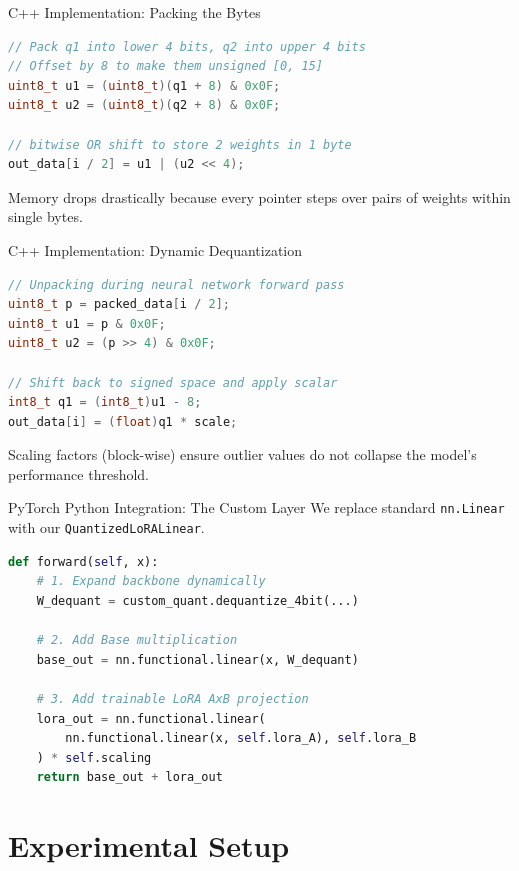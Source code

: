 \documentclass[aspectratio=169]{beamer}
\begin{document}
\begin{frame}[fragile]{C++ Implementation: Packing the Bytes}
    \begin{lstlisting}[language=C++]
// Pack q1 into lower 4 bits, q2 into upper 4 bits
// Offset by 8 to make them unsigned [0, 15]
uint8_t u1 = (uint8_t)(q1 + 8) & 0x0F;
uint8_t u2 = (uint8_t)(q2 + 8) & 0x0F;

// bitwise OR shift to store 2 weights in 1 byte
out_data[i / 2] = u1 | (u2 << 4);
    \end{lstlisting}
    \vspace{0.5cm}
    Memory drops drastically because every pointer steps over pairs of weights within single bytes.
\end{frame}

\begin{frame}[fragile]{C++ Implementation: Dynamic Dequantization}
    \begin{lstlisting}[language=C++]
// Unpacking during neural network forward pass
uint8_t p = packed_data[i / 2];
uint8_t u1 = p & 0x0F;
uint8_t u2 = (p >> 4) & 0x0F;

// Shift back to signed space and apply scalar
int8_t q1 = (int8_t)u1 - 8;
out_data[i] = (float)q1 * scale;
    \end{lstlisting}
    \vspace{0.5cm}
    Scaling factors (block-wise) ensure outlier values do not collapse the model's performance threshold.
\end{frame}

\begin{frame}[fragile]{PyTorch Python Integration: The Custom Layer}
     We replace standard \texttt{nn.Linear} with our \texttt{QuantizedLoRALinear}.
     \begin{lstlisting}[language=Python]
def forward(self, x):
    # 1. Expand backbone dynamically
    W_dequant = custom_quant.dequantize_4bit(...)
    
    # 2. Add Base multiplication
    base_out = nn.functional.linear(x, W_dequant)
    
    # 3. Add trainable LoRA AxB projection
    lora_out = nn.functional.linear(
        nn.functional.linear(x, self.lora_A), self.lora_B
    ) * self.scaling
    return base_out + lora_out
    \end{lstlisting}
\end{frame}

\section{Experimental Setup}
\end{document}
